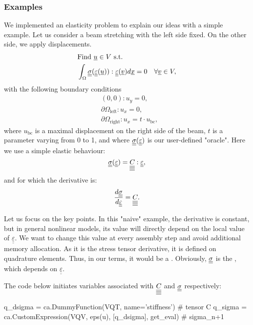 \documentclass[12pt]{article}
\begin{document}
\subsubsection{Examples}

We implemented an elasticity problem to explain our ideas with a simple example. Let us consider a beam stretching with the left side fixed. On the other side, we apply displacements. 
\begin{align}
    & \text{Find } \underline{u} \in V \text{ s.t.} \\
    & \int_\Omega \underline{\underline{\sigma}}(\underline{\underline{\varepsilon}}(\underline{u})) : \underline{\underline{\varepsilon}}(\underline{v}) d\underline{x}  = 0 \quad \forall \underline{v} \in V,
\end{align}
with the following boundary conditions
\begin{align}
    & (0, 0) : u_y = 0, \\
    & \partial\Omega_\text{left} : u_x = 0, \\
    & \partial\Omega_\text{right} : u_x = t \cdot u_\text{bc},
\end{align}
where $u_\text{bc}$ is a maximal displacement on the right side of the beam, $t$ is a parameter varying from 0 to 1, and where $\underline{\underline{\sigma}}(\underline{\underline{\varepsilon}})$ is our user-defined "oracle". Here we use a simple elastic behaviour:
\begin{equation}
    \underline{\underline{\sigma}}(\underline{\underline{\varepsilon}}) = \underline{\underline{\underline{\underline{C_{}}}}}:\underline{\underline{\varepsilon}},
\end{equation}
and for which the derivative is:
\begin{equation}
    \dfrac{d\underline{\underline{\sigma}}}{d\underline{\underline{\varepsilon}}} = \underline{\underline{\underline{\underline{C_{}}}}}.
\end{equation}

Let us focus on the key points. In this "naive" example, the derivative is constant, but in general nonlinear models, its value will directly depend on the local value of $\underline{\underline{\varepsilon}}$. We want to change this value at every assembly step and avoid additional memory allocation. As it is the stress tensor derivative, it is defined on quadrature elements. Thus, in our terms, it would be a . Obviously, $\underline{\underline{\sigma}}$ is the , which depends on $\underline{\underline{\varepsilon}}$. 

The code below initiates variables associated with $\underline{\underline{\underline{\underline{C_{}}}}}$ and $\underline{\underline{\sigma}}$ respectively:
\begin{pythoncode}
    q_dsigma = ca.DummyFunction(VQT, name='stiffness') # tensor C
    q_sigma = ca.CustomExpression(VQV, eps(u), [q_dsigma], get_eval)  # sigma_{n+1}
\end{pythoncode}
\end{document}
